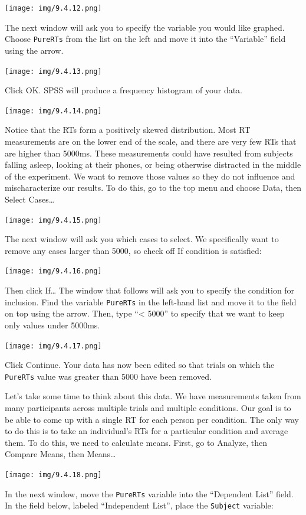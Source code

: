 \documentclass[
]{book}
\begin{document}
\texttt{[image: img/9.4.12.png]}

The next window will ask you to specify the variable you would like graphed. Choose \texttt{PureRTs} from the list on the left and move it into the ``Variable'' field using the arrow.

\texttt{[image: img/9.4.13.png]}

Click {OK}. SPSS will produce a frequency histogram of your data.

\texttt{[image: img/9.4.14.png]}

Notice that the RTs form a positively skewed distribution. Most RT measurements are on the lower end of the scale, and there are very few RTs that are higher than 5000ms. These measurements could have resulted from subjects falling asleep, looking at their phones, or being otherwise distracted in the middle of the experiment. We want to remove those values so they do not influence and mischaracterize our results. To do this, go to the top menu and choose {Data}, then {Select Cases\ldots{}}

\texttt{[image: img/9.4.15.png]}

The next window will ask you which cases to select. We specifically want to remove any cases larger than 5000, so check off {If condition is satisfied:}

\texttt{[image: img/9.4.16.png]}

Then click {If\ldots{}} The window that follows will ask you to specify the condition for inclusion. Find the variable \texttt{PureRTs} in the left-hand list and move it to the field on top using the arrow. Then, type ``\textless{} 5000'' to specify that we want to keep only values under 5000ms.

\texttt{[image: img/9.4.17.png]}

Click {Continue}. Your data has now been edited so that trials on which the \texttt{PureRTs} value was greater than 5000 have been removed.

Let's take some time to think about this data. We have measurements taken from many participants across multiple trials and multiple conditions. Our goal is to be able to come up with a single RT for each person per condition. The only way to do this is to take an individual's RTs for a particular condition and average them. To do this, we need to calculate means. First, go to {Analyze}, then {Compare Means}, then { Means\ldots{}}

\texttt{[image: img/9.4.18.png]}

In the next window, move the \texttt{PureRTs} variable into the ``Dependent List'' field. In the field below, labeled ``Independent List'', place the \texttt{Subject} variable:
\end{document}
